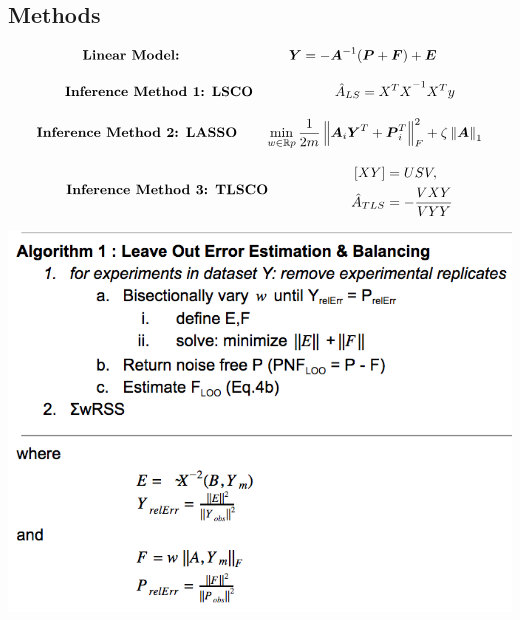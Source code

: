 \documentclass[a0,portrait]{a0poster}
\begin{document}
\begin{multicols}{2}


\section*{Methods}

\begin{equation*}\label{eq:Linearmap}
\text{\textbf{Linear Model:}} \qquad\qquad\qquad\qquad {\boldsymbol{Y}} = -{\boldsymbol{A}}^{-1}({\boldsymbol{P}}+{\boldsymbol{F}})+ {\boldsymbol{E}}
\end{equation*}

  \begin{equation*}
 \text{\textbf{Inference Method 1: LSCO}} \qquad\qquad\qquad \hat{A}_{LS}={{X^TX}^{-1} X^Ty}
 \label{eq:LSCO}
 \end{equation*}
 
  \begin{equation*}
 \text{\textbf{Inference Method 2: LASSO}} \qquad \min_{w \in \mathbb{R}p}
 \frac{1}{2m} \left\lVert{\boldsymbol{A}}_i{\boldsymbol{Y}}^T+{\boldsymbol{P}}^T_i\right\rVert^2_F + \zeta \left\lVert{\boldsymbol{A}}\right\rVert_1
 \label{eq:LASSO}
 \end{equation*}
 
 \begin{equation*}
  \text{\textbf{Inference Method 3: TLSCO}} \qquad\qquad\qquad
  \begin{aligned}
    \lbrack X Y\rbrack &= U S V , \\
    \hat{A}_{TLS} &= -\frac{VXY}{VYY}
 \label{eq:TLSCO}
  \end{aligned}
 \end{equation*}

\begin{center}
\includegraphics[width=.65\linewidth]{MYC_alg.png}
\end{center}


\end{multicols}
\end{document}

